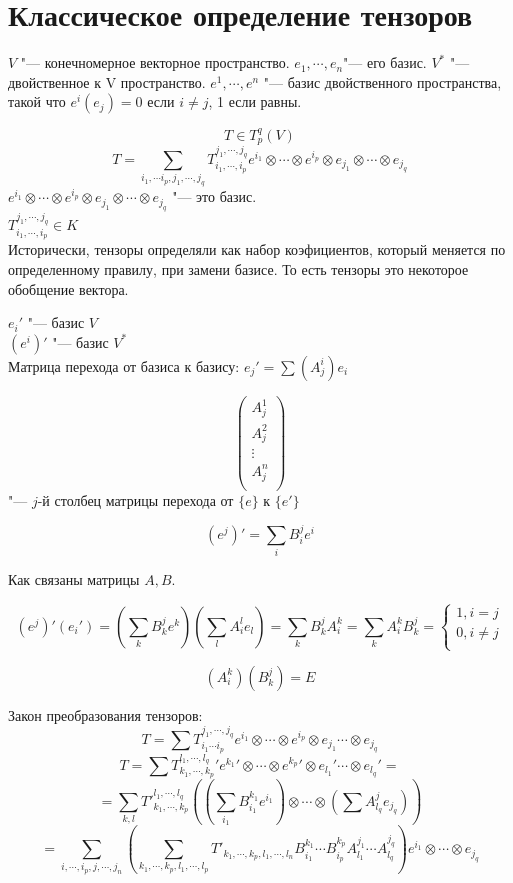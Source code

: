 ﻿\section{Классическое определение тензоров}
$V$ "--- конечномерное векторное пространство. 
$e_1, \cdots, e_n$"--- его базис.
$V^*$ "--- двойственное к V пространство. 
$e^1, \cdots, e^n$ "--- базис двойственного пространства, такой что $e^i(e_j) = 0$  если $i \ne j$, 1 если равны. 

$$T \in T_{p}^q(V)$$
$$T = \sum_{i_1, \cdots i_p, j_1, \cdots, j_q} T_{i_1, \cdots, i_p}^{j_1, \cdots, j_q}
 e^{i_1} \otimes \cdots \otimes e^{i_p} \otimes e_{j_1} \otimes \cdots \otimes e_{j_q}$$ 
$e^{i_1} \otimes \cdots \otimes e^{i_p} \otimes e_{j_1} \otimes \cdots \otimes e_{j_q}$ "--- это базис.\\
$T_{i_1, \cdots, i_p}^{j_1, \cdots, j_q} \in K$\\

Исторически, тензоры определяли как набор коэфициентов, который меняется по определенному правилу, 
при замени базисе. То есть тензоры это некоторое обобщение вектора.

$e_i'$ "--- базис $V$\\
$(e^i)'$ "--- базис $V^*$\\

Матрица перехода от базиса к базису: $e_j' = \sum(A_j^i)e_i$

$$\begin{pmatrix}
A^1_j\\
A^2_j\\
\vdots\\
A^n_j\\
\end{pmatrix}$$
"--- $j$-й столбец матрицы перехода от $\{e\}$ к $\{e'\}$

$$(e^j)' = \sum_{i}B^{j}_ie^i$$

Как связаны матрицы $A, B$.

$$(e^j)'(e_i') = (\sum_k B_{k}^je^k)(\sum_{l}A_{i}^le_l) = \sum_k B_{k}^j A_{i}^k = \sum_k A_i^kB_k^j = \left\{
\begin{aligned} 1, i = j\\ 
0, i \ne j\\
\end{aligned}
\right.$$

$$(A_i^k)(B_k^j) = E$$

Закон преобразования тензоров: 
$$T = \sum T_{i_1 \cdots i_p}^{j_1, \cdots, j_q}e^{i_1} \otimes \cdots \otimes e^{i_p} \otimes e_{j_1} \cdots \otimes e_{j_q}$$
$$T = \sum {T_{k_1, \cdots, k_p}^{l_1, \cdots, l_q}}'{e^{k_1}}' \otimes \cdots \otimes {e^{k_p}}' \otimes {e_{l_1}}' \cdots \otimes {e_{l_q}}' = $$
$$= \sum_{k,l}T'^{l_1, \cdots, l_q}_{k_1, \cdots, k_p}((\sum_{i_1}B_{i_1}^{k_1}e^{i_1}) \otimes \cdots \otimes (\sum A_{l_q}^{j}e_{j_q}))$$
$$=\sum_{i, \cdots, i_p, j,\cdots, j_n} (\sum_{k_1,\cdots, k_p, l_1, \cdots, l_p}T'_{k_1, \cdots, k_p, l_1, \cdots, l_n}B_{i_1}^{k_1} \cdots B_{i_p}^{k_p}A_{l_1}^{j_1} \cdots A_{l_q}^{j_q})e^{i_1} \otimes \cdots \otimes e_{j_q}$$

